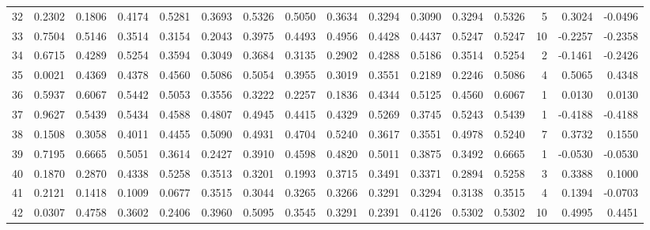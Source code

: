 \begin{tabular}{lrrrrrrrrrrrrrrr}
32  &      0.2302 &  0.1806 &  0.4174 &  0.5281 &  0.3693 &  0.5326 &  0.5050 &  0.3634 &  0.3294 &  0.3090 &   0.3294 &     0.5326 &      5 &                    0.3024 &                    -0.0496 \\
33  &      0.7504 &  0.5146 &  0.3514 &  0.3154 &  0.2043 &  0.3975 &  0.4493 &  0.4956 &  0.4428 &  0.4437 &   0.5247 &     0.5247 &     10 &                   -0.2257 &                    -0.2358 \\
34  &      0.6715 &  0.4289 &  0.5254 &  0.3594 &  0.3049 &  0.3684 &  0.3135 &  0.2902 &  0.4288 &  0.5186 &   0.3514 &     0.5254 &      2 &                   -0.1461 &                    -0.2426 \\
35  &      0.0021 &  0.4369 &  0.4378 &  0.4560 &  0.5086 &  0.5054 &  0.3955 &  0.3019 &  0.3551 &  0.2189 &   0.2246 &     0.5086 &      4 &                    0.5065 &                     0.4348 \\
36  &      0.5937 &  0.6067 &  0.5442 &  0.5053 &  0.3556 &  0.3222 &  0.2257 &  0.1836 &  0.4344 &  0.5125 &   0.4560 &     0.6067 &      1 &                    0.0130 &                     0.0130 \\
37  &      0.9627 &  0.5439 &  0.5434 &  0.4588 &  0.4807 &  0.4945 &  0.4415 &  0.4329 &  0.5269 &  0.3745 &   0.5243 &     0.5439 &      1 &                   -0.4188 &                    -0.4188 \\
38  &      0.1508 &  0.3058 &  0.4011 &  0.4455 &  0.5090 &  0.4931 &  0.4704 &  0.5240 &  0.3617 &  0.3551 &   0.4978 &     0.5240 &      7 &                    0.3732 &                     0.1550 \\
39  &      0.7195 &  0.6665 &  0.5051 &  0.3614 &  0.2427 &  0.3910 &  0.4598 &  0.4820 &  0.5011 &  0.3875 &   0.3492 &     0.6665 &      1 &                   -0.0530 &                    -0.0530 \\
40  &      0.1870 &  0.2870 &  0.4338 &  0.5258 &  0.3513 &  0.3201 &  0.1993 &  0.3715 &  0.3491 &  0.3371 &   0.2894 &     0.5258 &      3 &                    0.3388 &                     0.1000 \\
41  &      0.2121 &  0.1418 &  0.1009 &  0.0677 &  0.3515 &  0.3044 &  0.3265 &  0.3266 &  0.3291 &  0.3294 &   0.3138 &     0.3515 &      4 &                    0.1394 &                    -0.0703 \\
42  &      0.0307 &  0.4758 &  0.3602 &  0.2406 &  0.3960 &  0.5095 &  0.3545 &  0.3291 &  0.2391 &  0.4126 &   0.5302 &     0.5302 &     10 &                    0.4995 &                     0.4451 \\

\end{tabular}
